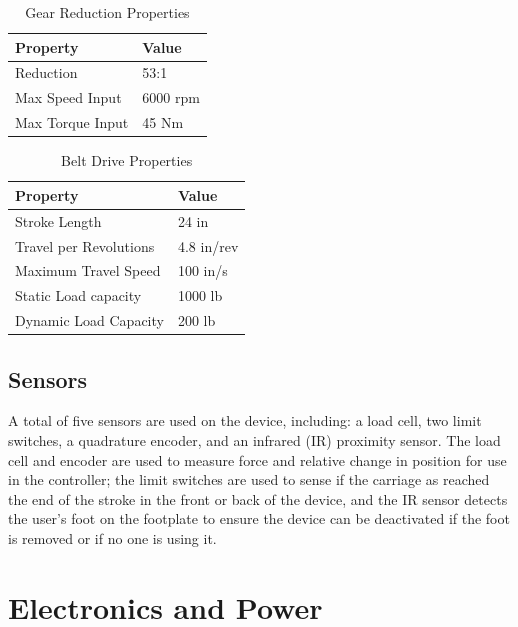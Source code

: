 \documentclass[12pt]{report}
\begin{document}
	\begin{table}[]
	\centering
	\caption{Gear Reduction Properties}	
	\begin{tabular}{|l|l|}
		\hline
		\textbf{Property} & \textbf{Value}  \\ \hline
 		Reduction & 53:1  \\ \hline
 		Max Speed Input & 6000 rpm  \\ \hline
 		Max Torque Input & 45 Nm  \\ \hline
		\end{tabular}
	\label{tab:gear}
	\end{table}
	
	\begin{table}[]
	\centering
	\caption{Belt Drive Properties}	
	\begin{tabular}{|l|l|}
		\hline
		\textbf{Property} & \textbf{Value}  \\ \hline
		Stroke Length & 24 in  \\ \hline
 		Travel per Revolutions & 4.8 in/rev  \\ \hline
 		Maximum Travel Speed & 100 in/s  \\ \hline
 		Static Load capacity & 1000 lb  \\ \hline
 		Dynamic Load Capacity & 200 lb  \\ \hline
		\end{tabular}
	\label{tab:belt}
	\end{table}
	
	 
		
		\subsection{Sensors}

	A total of five sensors are used on the device, including: a load cell, two limit switches, a quadrature encoder, and an infrared (IR) proximity sensor. The load cell and encoder are used to measure force and relative change in position for use in the controller; the limit switches are used to sense if the carriage as reached the end of the stroke in the front or back of the device, and the IR sensor detects the user's foot on the footplate to ensure the device can be deactivated if the foot is removed or if no one is using it. 		
		
	\section{Electronics and Power}
	
\end{document}
